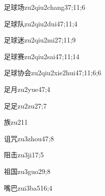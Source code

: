 \begin{verbete}{足球场}{zu2qiu2chang3}{7;11;6}
\end{verbete}

\begin{verbete}{足球队}{zu2qiu2dui4}{7;11;4}
\end{verbete}

\begin{verbete}{足球迷}{zu2qiu2mi2}{7;11;9}
\end{verbete}

\begin{verbete}{足球赛}{zu2qiu2sai4}{7;11;14}
\end{verbete}

\begin{verbete}{足球协会}{zu2qiu2xie2hui4}{7;11;6;6}
\end{verbete}

\begin{verbete}{足月}{zu2yue4}{7;4}
\end{verbete}

\begin{verbete}{足足}{zu2zu2}{7;7}
\end{verbete}

\begin{verbete}{族}{zu2}{11}
\end{verbete}

\begin{verbete}{诅咒}{zu3zhou4}{7;8}
\end{verbete}

\begin{verbete}{阻击}{zu3ji1}{7;5}
\end{verbete}

\begin{verbete}{祖国}{zu3guo2}{9;8}
\end{verbete}

\begin{verbete}{嘴巴}{zui3ba5}{16;4}
\end{verbete}

